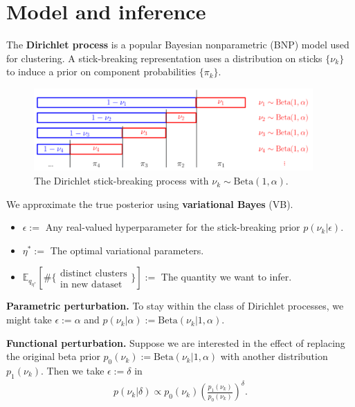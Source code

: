 \documentclass[a0,plainsections,30pt]{sciposter}\usepackage[]{graphicx}\usepackage[]{color}
\newcommand{\Expect}{\mathbb{E}}
\newcommand{\etaopt}{\eta^{*}}
\newcommand{\targetexpectation}{\Expect_{q_{\eta^*}}
\left[\#\{\substack{\text{distinct clusters}\\\text{in new dataset}}\} \right]}
\begin{document}
\begin{minipage}[t]{0.45\textwidth}
\section*{Model and inference }
\vspace{-0.3in}


The \textbf{Dirichlet process} is a popular Bayesian nonparametric
(BNP) model used for clustering.  A stick-breaking representation uses
a distribution on sticks $\{\nu_k\}$ to induce a prior on component
probabilities $\{\pi_k\}$.

\begin{figure}[!h]
\centering
\includegraphics[width = 0.95\textwidth]{./static_images/DP_stick_breaking.png}
\caption{The Dirichlet stick-breaking process with
$\nu_k \sim \mathrm{Beta}(1, \alpha)$.}
\setlength{\textfloatsep}{-10pt}
\end{figure}
%
We approximate the true posterior using \textbf{variational Bayes} (VB).

\begin{itemize}
\item $\epsilon :=$ Any real-valued hyperparameter for the stick-breaking prior
    $p(\nu_k | \epsilon)$.
\item $\etaopt :=$ The optimal variational parameters.
\item $\targetexpectation :=$ The quantity we want to infer.
\end{itemize}

\textbf{Parametric perturbation.} To stay within the class of Dirichlet
processes, we might take $\epsilon := \alpha$ and $p(\nu_k | \alpha) :=
\mathrm{Beta}(\nu_k | 1, \alpha)$.

\textbf{Functional perturbation.} Suppose we are interested in the effect of
replacing the original beta prior $p_0(\nu_k) := \mathrm{Beta}(\nu_k | 1,
\alpha)$ with another distribution $p_1(\nu_k)$. Then we take $\epsilon :=
\delta$ in
%
\vspace{-0.3in}
\begin{align*}
p(\nu_k \vert \delta) \propto
    p_{0}(\nu_k)\left(\frac{p_1(\nu_k)}{p_0(\nu_k)}\right)^\delta.
\end{align*}
\vspace{-0.3in}


\end{minipage}
\end{document}
